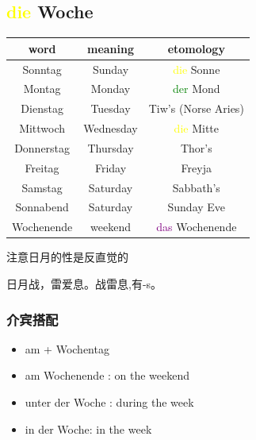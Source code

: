 \subsection{\textcolor{yellow}{die} Woche}

\begin{center}
    \begin{tabular}{|c|c|c|}
        \hline
        \rowcolor{gray}
        word       & meaning   & etomology                          \\
        \hline
        Sonntag    & Sunday    & \textcolor{yellow}{die} Sonne      \\
        \hline
        Montag     & Monday    & \textcolor{green}{der} Mond        \\
        \hline
        Dienstag   & Tuesday   & Tiw's (Norse Aries)                \\
        \hline
        Mittwoch   & Wednesday & \textcolor{yellow}{die} Mitte      \\
        \hline
        Donnerstag & Thursday  & Thor's                             \\
        \hline
        Freitag    & Friday    & Freyja                             \\
        \hline
        Samstag    & Saturday  & Sabbath's                          \\
        \hline
        Sonnabend  & Saturday  & Sunday Eve                         \\
        \hline
        Wochenende & weekend   & \textcolor{purple}{das} Wochenende \\
        \hline
    \end{tabular}
\end{center}

注意日月的性是反直觉的
\begin{myquote}
    日月战，雷爱息。战雷息,有-s。
\end{myquote}

\subsubsection{介宾搭配}
\begin{itemize}
    \item am + Wochentag \pill[border=true, shape={type=olive, size=large, color=green}] \olive[color=green]
    \item am Wochenende \pill[border=true, shape={type=olive, size=large, color=green}] \olive[color=green]: on the weekend
    \item unter der Woche \sqr[color=green]: during the week
    \item in der Woche: in the week
\end{itemize}

